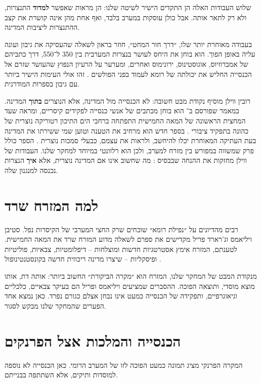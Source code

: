 שלוש העבודות האלה הן התקדים הישיר לשיטה שלנו: הן מראות שאפשר \textbf{למדוד} התנצרות, ולא רק לתאר אותה. אבל כולן עוסקות במערב בלבד, ואף אחת מהן אינה קושרת את קצב ההתנצרות ליציבות המדינה.

בעבודה מאוחרת יותר שלו, ״דרך חור המחט״, חוזר בראון לשאלה שהעסיקה את גיבון ועונה עליה באופן הפוך. הוא בוחן את היחס לעושר בנצרות המערבית בין 350 ל־550, דרך כתביהם של אמברוזיוס, אוגוסטינוס, ירונימוס ואחרים, ומערער על הרעיון הנפוץ שהעושר שזרם אל הכנסייה החליש את יכולתה של רומא לעמוד בפני הפולשים \cite{brown2012needle}. זהו אולי העימות הישיר ביותר עם גיבון בספרות המודרנית.

רובין ווילן מוסיף נקודת מבט חשובה: לא הכנסייה מול המדינה, אלא הנוצרים \textbf{בתוך} המדינה. במאמר שפורסם ב־ הוא בוחן מכתבים של אנשי כנסייה לפקידים קיסריים, ומראה שעד המחצית הראשונה של המאה החמישית התפתחה ברחבי הים התיכון רטוריקה נוצרית של כהונה בתפקיד ציבורי \cite{whelan2018mirrors}. בספר חדש הוא מרחיב את הטענה וטוען שמי ששירתו את המדינה בעת העתיקה המאוחרת יכלו להיחשב, ולראות את עצמם, כבעלי סמכות נוצרית \cite{whelan2026serving}. הספר כולל פרק שמשווה במפורש בין מזרח למערב, ולכן הוא רלוונטי במיוחד למחקר שלנו. העבודות של ווילן מחזקות את ההנחה שבבסיס : מה שחשוב אינו אם המדינה נוצרית, אלא \textbf{איך} הנצרות נכנסה למנגנון שלה.

\section{למה המזרח שרד}
\label{sec:lit-east}

רבים מהדיונים על ״נפילת רומא״ שוכחים שרק החצי המערבי של הקיסרות נפל. סטיבן ויליאמס וג'רארד פריל מקדישים את ספרם לשאלה מדוע המזרח שרד את המאה החמישית. לטענתם, המזרח אימץ אסטרטגיות חדשות ומוצלחות – דיפלומטיות, צבאיות, פוליטיות ופיסקליות – שיצרו מדינה ריכוזית חדשה בקונסטנטינופול \cite{williams1999rome}.

מנקודת המבט של המחקר שלנו, המזרח הוא ״מקרה הביקורת״ החשוב ביותר: אותה דת, אותו מוצא מוסדי, ותוצאה הפוכה. ההסברים שמציעים ויליאמס ופריל הם בעיקר צבאיים, כלכליים וגיאוגרפיים, ותפקידה של הכנסייה כמעט אינו נבחן אצלם כגורם נפרד. כאן נמצא אחד הפערים שהמחקר שלנו מבקש לסגור.

\section{הכנסייה והמלכות אצל הפרנקים}
\label{sec:lit-franks}

המקרה הפרנקי מציג תמונה כמעט הפוכה לזו של המערב הרומי. כאן הכנסייה לא נוספה למוסדות ותיקים, אלא השתתפה בבנייתם.

